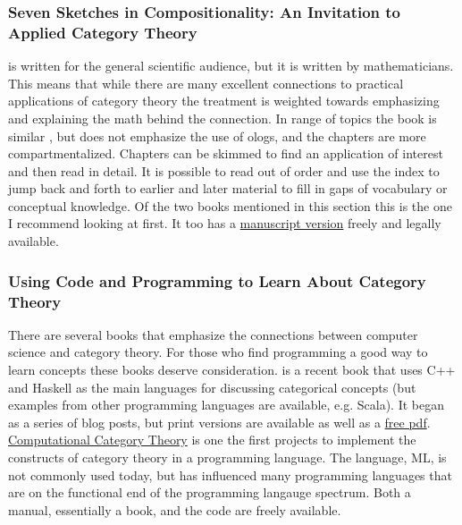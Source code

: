 \documentclass{article}
\begin{document}
\subsubsection{Seven Sketches in Compositionality: An Invitation to Applied Category Theory}

\textcite{fong18_seven_sketc_compos} is written for the general scientific audience, but it is written by mathematicians. This means that while there are many excellent connections to practical applications of category theory the treatment is weighted towards emphasizing and explaining the math behind the connection. In range of topics the book is similar \cite{spivak14_categ}, but does not emphasize the use of ologs, and the chapters are more compartmentalized. Chapters can be skimmed to find an application of interest and then read in detail. It is possible to read out of order and use the index to jump back and forth to earlier and later material to fill in gaps of vocabulary or conceptual knowledge. Of the two books mentioned in this section this is the one I recommend looking at first. It too has a \href{https://arxiv.org/pdf/1803.05316}{manuscript version} freely and legally available.

\subsubsection{Using Code and Programming to Learn About Category Theory}

There are several books that emphasize the connections between computer science and category theory. For those who find programming a good way to learn concepts these books deserve consideration. \textcite{milewski19_categ} is a recent book that uses C++ and Haskell as the main languages for discussing categorical concepts (but examples from other programming languages are available, e.g. Scala). It began as a series of blog posts, but print versions are available as well as a \href{https://github.com/hmemcpy/milewski-ctfp-pdf}{free pdf}. \href{https://www.cs.man.ac.uk/~david/categories/}{Computational Category Theory} is one the first projects to implement the constructs of category theory in a programming language. The language, ML, is not commonly used today, but has influenced many programming languages that are on the functional end of the programming langauge spectrum. Both a manual, essentially a book, and the code are freely available.
\end{document}
